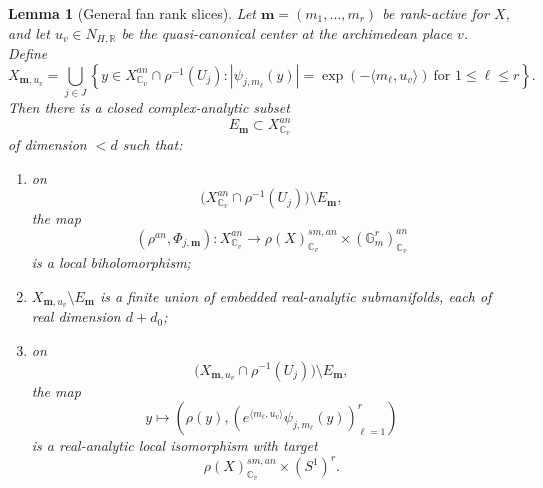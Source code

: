 \documentclass[10pt,a4paper]{amsart}
\theoremstyle{plain}
\newtheorem{lemma}[theorem]{Lemma}
\theoremstyle{plain}
\numberwithin{equation}{section}
\begin{document}
\begin{lemma}[General fan rank slices]
	\label{lem:general-fan-rank-slices}
	Let \(\mathbf m=(m_1,\ldots,m_r)\) be rank-active for \(X\), and let
	\(u_v\in N_{H,\mathbb R}\) be the quasi-canonical center at the archimedean
	place \(v\).  Define
	\[
	X_{\mathbf m,u_v}
	=
	\bigcup_{j\in J}
	\left\{
	y\in X^{an}_{\mathbb C_v}\cap\rho^{-1}(U_j):
	|\psi_{j,m_\ell}(y)|
	=
	\exp(-\langle m_\ell,u_v\rangle)
	\ \text{for }1\le \ell\le r
	\right\}.
	\]
	Then there is a closed complex-analytic subset
	\[
	E_{\mathbf m}\subset X^{an}_{\mathbb C_v}
	\]
	of dimension \(<d\) such that:
	\begin{enumerate}[label=\textup{(\alph*)},leftmargin=2em]
		\item on
		\[
		\bigl(X^{an}_{\mathbb C_v}\cap \rho^{-1}(U_j)\bigr)\setminus E_{\mathbf m},
		\]
		the map
		\[
		(\rho^{an},\Phi_{j,\mathbf m})
		:
		X^{an}_{\mathbb C_v}\longrightarrow
		\rho(X)^{sm,an}_{\mathbb C_v}\times(\mathbb G_m^r)^{an}_{\mathbb C_v}
		\]
		is a local biholomorphism;
		\item \(X_{\mathbf m,u_v}\setminus E_{\mathbf m}\) is a finite union of
		embedded real-analytic submanifolds, each of real dimension \(d+d_0\);
		\item on
		\[
		\bigl(X_{\mathbf m,u_v}\cap\rho^{-1}(U_j)\bigr)\setminus E_{\mathbf m},
		\]
		the map
		\[
		y\longmapsto
		\left(\rho(y),
		\left(e^{\langle m_\ell,u_v\rangle}\psi_{j,m_\ell}(y)\right)_{\ell=1}^r
		\right)
		\]
		is a real-analytic local isomorphism with target
		\[
		\rho(X)^{sm,an}_{\mathbb C_v}\times(S^1)^r .
		\]
	\end{enumerate}
\end{lemma}
\end{document}
